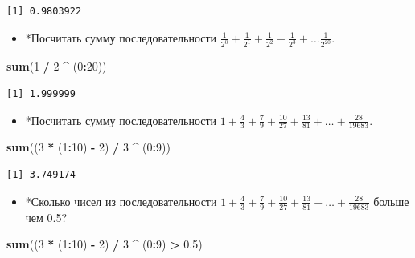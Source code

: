 \documentclass[
]{book}
\newenvironment{Shaded}{\begin{snugshade}}{\end{snugshade}}
\newcommand{\DecValTok}[1]{\textcolor[rgb]{0.00,0.00,0.81}{#1}}
\newcommand{\FloatTok}[1]{\textcolor[rgb]{0.00,0.00,0.81}{#1}}
\newcommand{\KeywordTok}[1]{\textcolor[rgb]{0.13,0.29,0.53}{\textbf{#1}}}
\newcommand{\NormalTok}[1]{#1}
\newcommand{\OperatorTok}[1]{\textcolor[rgb]{0.81,0.36,0.00}{\textbf{#1}}}
\newcommand{\StringTok}[1]{\textcolor[rgb]{0.31,0.60,0.02}{#1}}
\providecommand{\tightlist}{%
  \setlength{\itemsep}{0pt}\setlength{\parskip}{0pt}}
\begin{document}
\begin{verbatim}
[1] 0.9803922
\end{verbatim}

\begin{itemize}
\tightlist
\item
  *Посчитать сумму последовательности \(\frac{1}{2^{0}}+\frac{1}{2^{1}}+\frac{1}{2^{2}}+\frac{1}{2^{3}}+\ldots \frac{1}{2^{20}}\).
\end{itemize}

\begin{Shaded}
\begin{Highlighting}[]
\KeywordTok{sum}\NormalTok{(}\DecValTok{1} \OperatorTok{/}\StringTok{ }\DecValTok{2} \OperatorTok{^}\StringTok{ }\NormalTok{(}\DecValTok{0}\OperatorTok{:}\DecValTok{20}\NormalTok{))}
\end{Highlighting}
\end{Shaded}

\begin{verbatim}
[1] 1.999999
\end{verbatim}

\begin{itemize}
\tightlist
\item
  *Посчитать сумму последовательности \(1+\frac{4}{3}+\frac{7}{9}+\frac{10}{27}+\frac{13}{81}+\ldots+\frac{28}{19683}\).
\end{itemize}

\begin{Shaded}
\begin{Highlighting}[]
\KeywordTok{sum}\NormalTok{((}\DecValTok{3} \OperatorTok{*}\StringTok{ }\NormalTok{(}\DecValTok{1}\OperatorTok{:}\DecValTok{10}\NormalTok{) }\OperatorTok{-}\StringTok{ }\DecValTok{2}\NormalTok{) }\OperatorTok{/}\StringTok{ }\DecValTok{3} \OperatorTok{^}\StringTok{ }\NormalTok{(}\DecValTok{0}\OperatorTok{:}\DecValTok{9}\NormalTok{))}
\end{Highlighting}
\end{Shaded}

\begin{verbatim}
[1] 3.749174
\end{verbatim}

\begin{itemize}
\tightlist
\item
  *Сколько чисел из последовательности \(1+\frac{4}{3}+\frac{7}{9}+\frac{10}{27}+\frac{13}{81}+\ldots+\frac{28}{19683}\) больше чем 0.5?
\end{itemize}

\begin{Shaded}
\begin{Highlighting}[]
\KeywordTok{sum}\NormalTok{((}\DecValTok{3} \OperatorTok{*}\StringTok{ }\NormalTok{(}\DecValTok{1}\OperatorTok{:}\DecValTok{10}\NormalTok{) }\OperatorTok{-}\StringTok{ }\DecValTok{2}\NormalTok{) }\OperatorTok{/}\StringTok{ }\DecValTok{3} \OperatorTok{^}\StringTok{ }\NormalTok{(}\DecValTok{0}\OperatorTok{:}\DecValTok{9}\NormalTok{) }\OperatorTok{>}\StringTok{ }\FloatTok{0.5}\NormalTok{)}
\end{Highlighting}
\end{Shaded}
\end{document}
